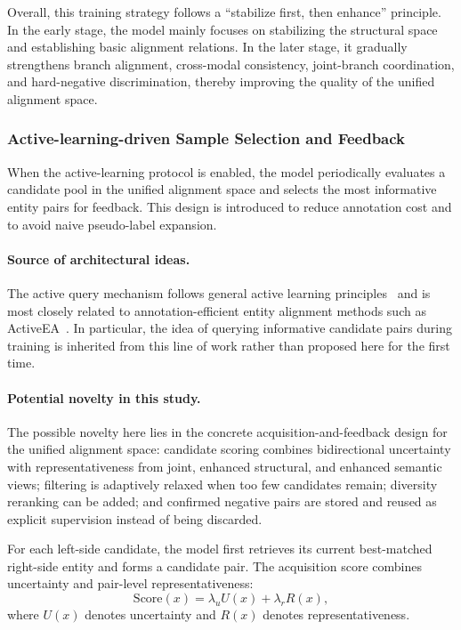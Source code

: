 Overall, this training strategy follows a ``stabilize first, then enhance'' principle. In the early stage, the model mainly focuses on stabilizing the structural space and establishing basic alignment relations. In the later stage, it gradually strengthens branch alignment, cross-modal consistency, joint-branch coordination, and hard-negative discrimination, thereby improving the quality of the unified alignment space.

\subsubsection{Active-learning-driven Sample Selection and Feedback}

When the active-learning protocol is enabled, the model periodically evaluates a candidate pool in the unified alignment space and selects the most informative entity pairs for feedback. This design is introduced to reduce annotation cost and to avoid naive pseudo-label expansion.

\paragraph{Source of architectural ideas.}
The active query mechanism follows general active learning principles~\cite{settles2009active} and is most closely related to annotation-efficient entity alignment methods such as ActiveEA~\cite{liu2021activeea}. In particular, the idea of querying informative candidate pairs during training is inherited from this line of work rather than proposed here for the first time.

\paragraph{Potential novelty in this study.}
The possible novelty here lies in the concrete acquisition-and-feedback design for the unified alignment space: candidate scoring combines bidirectional uncertainty with representativeness from joint, enhanced structural, and enhanced semantic views; filtering is adaptively relaxed when too few candidates remain; diversity reranking can be added; and confirmed negative pairs are stored and reused as explicit supervision instead of being discarded.

For each left-side candidate, the model first retrieves its current best-matched right-side entity and forms a candidate pair. The acquisition score combines uncertainty and pair-level representativeness:
\begin{equation}
\mathrm{Score}(x)
=
\lambda_u U(x) + \lambda_r R(x),
\end{equation}
where $U(x)$ denotes uncertainty and $R(x)$ denotes representativeness.

